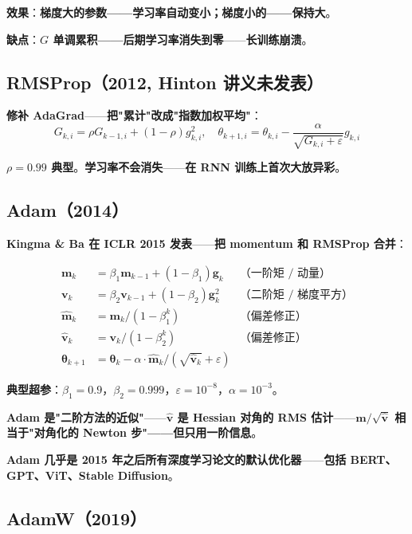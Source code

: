 \textbf{效果}：\textbf{梯度大的参数——学习率自动变小；梯度小的——保持大}。

\textbf{缺点}：\textbf{$G$ 单调累积——后期学习率\textbf{消失到零}}——\textbf{长训练崩溃}。

\subsection{RMSProp（2012, Hinton 讲义未发表）}

\textbf{修补 AdaGrad}——\textbf{把"累计"改成"指数加权平均"}：
\begin{equation}
G_{k,i} = \rho G_{k-1,i} + (1-\rho) g_{k,i}^2, \quad \theta_{k+1,i} = \theta_{k,i} - \frac{\alpha}{\sqrt{G_{k,i} + \varepsilon}} g_{k,i}
\end{equation}

\textbf{$\rho = 0.99$ 典型}。\textbf{学习率不会消失}——\textbf{在 RNN 训练上首次大放异彩}。

\subsection{Adam（2014）}

\textbf{Kingma \& Ba 在 ICLR 2015 发表}——\textbf{把 momentum 和 RMSProp \textbf{合并}}：

\begin{align}
\bm m_k &= \beta_1 \bm m_{k-1} + (1-\beta_1) \bm g_k & \text{（一阶矩 / 动量）} \\
\bm v_k &= \beta_2 \bm v_{k-1} + (1-\beta_2) \bm g_k^2 & \text{（二阶矩 / 梯度平方）} \\
\hat{\bm m}_k &= \bm m_k / (1 - \beta_1^k) & \text{（偏差修正）} \\
\hat{\bm v}_k &= \bm v_k / (1 - \beta_2^k) & \text{（偏差修正）} \\
\bm \theta_{k+1} &= \bm \theta_k - \alpha \cdot \hat{\bm m}_k / (\sqrt{\hat{\bm v}_k} + \varepsilon)
\end{align}

\textbf{典型超参}：$\beta_1 = 0.9$，$\beta_2 = 0.999$，$\varepsilon = 10^{-8}$，$\alpha = 10^{-3}$。

\textbf{Adam 是"二阶方法的近似"}——\textbf{$\hat{\bm v}$ 是 Hessian 对角的 RMS 估计}——\textbf{$\hat{\bm m}/\sqrt{\hat{\bm v}}$ 相当于"\textbf{对角化的 Newton 步}"——但只用一阶信息}。

\textbf{Adam 几乎是 2015 年之后所有深度学习论文的默认优化器}——\textbf{包括 BERT、GPT、ViT、Stable Diffusion}。

\subsection{AdamW（2019）}

